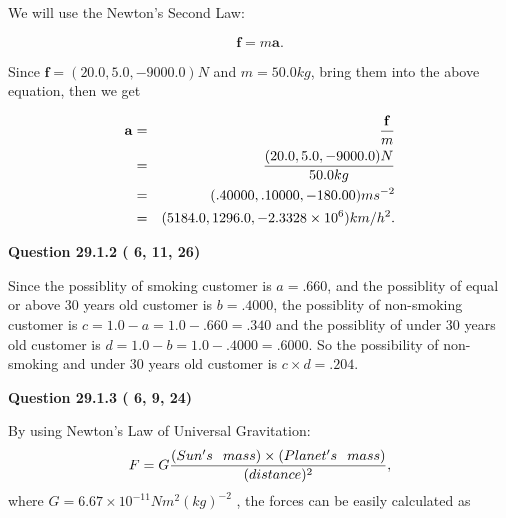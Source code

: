 \documentclass[12pt]{article}
\begin{document}
We will use the Newton's Second Law:
 
\[
\mathbf{f}=m\mathbf{a}.
\]
 
Since $\mathbf{f}=( %
20.0,  %
5.0,  %
-9000.0 )N$
and $m= %
50.0kg$, bring them into the above equation, then we get
 
\begin{eqnarray*}
\mathbf{a}&=&\frac{\mathbf{f}}m  \\
&=&\frac{(
20.0 ,
5.0 ,
-9000.0 )N
}{ %
50.0 kg}  \\
&=&(
.40000 ,
.10000,
-180.00
)ms^{-2} \\
&=&(
5184.0 ,
1296.0 ,
-2.3328 \times 10^{6}
)km/h^2.
\end{eqnarray*}
 
 
 
  
\vspace{0.2in}
  
{\textbf{\Large{Question
29.1.2 
 (          6,         11,         26)
}}}
  
  
 
 

Since the possiblity of  %
smoking customer is $ a =  %
.660 $,
and the possiblity of  %
equal or above 30 years old customer is $ b =  %
.4000 $,
the possiblity of  %
non-smoking customer is $ c = 1.0 - a = 1.0 -
.660
=  %
.340 $ and the possiblity of  %
under 30 years old
customer is $ d = 1.0 - b = 1.0 -  %
.4000 =  %
.6000  $.
So the possibility of  %
 non-smoking and  %
under 30 years old
customer is $ c \times d =  %
.204 $.
 
 
 
  
\vspace{0.2in}
  
{\textbf{\Large{Question
29.1.3 
 (          6,          9,         24)
}}}
  
  
 
 

By using Newton's Law of Universal Gravitation:
\[
F=G \frac{(Sun's \hspace{0.1in} mass) \times (Planet's \hspace{0.1in} mass)} { (distance)^2},
\]
where
$ G= %
6.67 \times 10^{-11}N m^{2}(kg)^{-2}$ , the forces can be easily calculated as
 
\vspace{0.2in}
 
\end{document}

